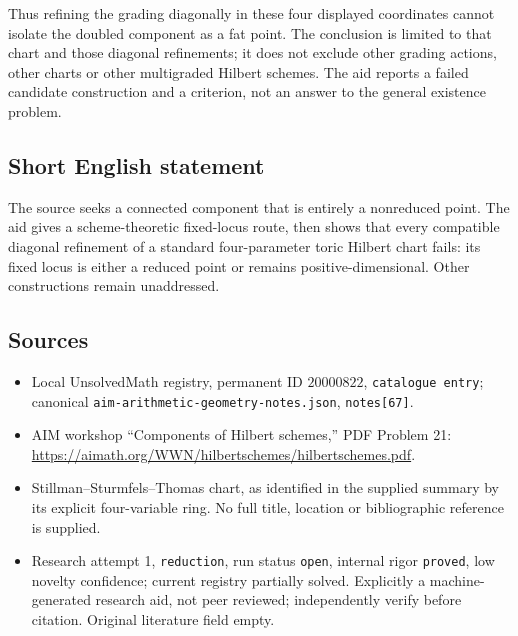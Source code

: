 \documentclass[11pt]{article}
\begin{document}
Thus refining the grading diagonally in these four displayed coordinates cannot isolate the doubled component as a fat point. The conclusion is limited to that chart and those diagonal refinements; it does not exclude other grading actions, other charts or other multigraded Hilbert schemes. The aid reports a failed candidate construction and a criterion, not an answer to the general existence problem.
\subsection{Short English statement}
The source seeks a connected component that is entirely a nonreduced point. The aid gives a scheme-theoretic fixed-locus route, then shows that every compatible diagonal refinement of a standard four-parameter toric Hilbert chart fails: its fixed locus is either a reduced point or remains positive-dimensional. Other constructions remain unaddressed.
\subsection{Sources}
\begin{itemize}
\item Local UnsolvedMath registry, permanent ID $20000822$, \texttt{catalogue entry}; canonical \texttt{aim-arithmetic-geometry-notes.json}, \texttt{notes[67]}.
\item AIM workshop ``Components of Hilbert schemes,'' PDF Problem 21: \url{https://aimath.org/WWN/hilbertschemes/hilbertschemes.pdf}.
\item Stillman--Sturmfels--Thomas chart, as identified in the supplied summary by its explicit four-variable ring. No full title, location or bibliographic reference is supplied.
\item Research attempt 1, \texttt{reduction}, run status \texttt{open}, internal rigor \texttt{proved}, low novelty confidence; current registry partially solved. Explicitly a machine-generated research aid, not peer reviewed; independently verify before citation. Original literature field empty.
\end{itemize}
\end{document}
